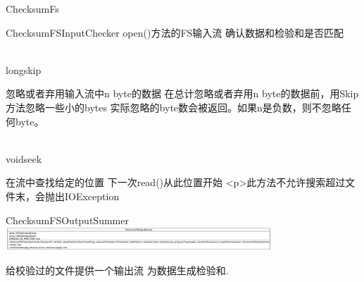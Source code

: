 \begin{XeClass}{ChecksumFs}
\begin{XeInnerClass}{ChecksumFSInputChecker}
 open()方法的FS输入流
 确认数据和检验和是否匹配

        \begin{XeMethod}{\XePublic \\ \XeSync}{long}{skip}
             
 忽略或者弃用输入流中n byte的数据
 在总计忽略或者弃用n byte的数据前，用Skip方法忽略一些小的bytes
 实际忽略的byte数会被返回。如果n是负数，则不忽略任何byte。

        \end{XeMethod}

        \begin{XeMethod}{\XePublic \\ \XeSync}{void}{seek}
             
 在流中查找给定的位置
 下一次read()从此位置开始
 <p>此方法不允许搜索超过文件末，会抛出IOException

        \end{XeMethod}

    \end{XeInnerClass}
    \begin{XeInnerClass}{ChecksumFSOutputSummer}
\includegraphics[width=10cm]{cdig/ChecksumFSOutputSummer.png}
         
 给校验过的文件提供一个输出流
 为数据生成检验和.

    \end{XeInnerClass}
\end{XeClass}
